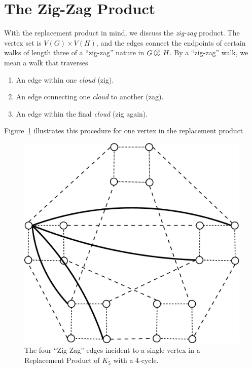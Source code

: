 \section{The Zig-Zag Product}
\label{sec:zig-zag-product}

With the replacement product in mind, we  discuss the {\em zig-zag} product.  The vertex set is $V(G) \times V(H)$, and the edges connect the endpoints of certain walks of length three of a ``zig-zag'' nature in $G \replacement H$. By a ``zig-zag'' walk, we mean a walk that traverses

\begin{enumerate}
\item An edge within one {\em cloud} (zig).
\item An edge connecting one {\em cloud} to another (zag).
\item An edge within the final {\em cloud} (zig again).
\end{enumerate} 
\noindent
Figure~\ref{fig:zigzag} illustrates this procedure for one vertex in the replacement product

\begin{figure}[h!]
\centering
\begin{minipage}{.42\textwidth}
\includegraphics[height=.28\textheight]{pics/zig_zagK5_C4}
\caption{The four ``Zig-Zag'' edges incident to a single vertex in a Replacement Product of $K_5$ with a 4-cycle. \label{fig:zigzag}}
\end{minipage}
\end{figure}
\noindent

